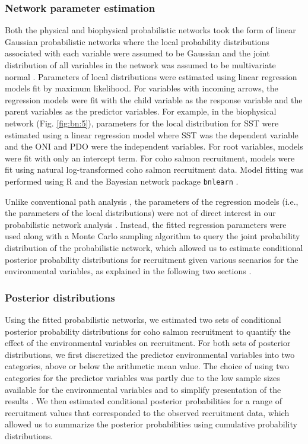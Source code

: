 \subsubsection{Network parameter estimation}

Both the physical and biophysical probabilistic networks took the form of linear
Gaussian probabilistic networks where the local probability distributions
associated with each variable were assumed to be Gaussian and the joint
distribution of all variables in the network was assumed to be multivariate
normal \citep{Shachter1989a, Koller2009a}. Parameters of local distributions
were estimated using linear regression models fit by maximum likelihood. For
variables with incoming arrows, the regression models were fit with the child
variable as the response variable and the parent variables as the predictor
variables. For example, in the biophysical network (Fig. \ref{fig:bn:5}),
parameters for the local distribution for SST were estimated using a linear
regression model where SST was the dependent variable and the ONI and PDO were
the independent variables. For root variables, models were fit with only an
intercept term. For coho salmon recruitment, models were fit using natural
log-transformed coho salmon recruitment data. Model fitting was performed using
R and the Bayesian network package \texttt{bnlearn} \citep{Scutari2010,
Rcore2013a}.

Unlike conventional path analysis \citep{Wright1934}, the parameters of the
regression models (i.e., the parameters of the local distributions) were not of
direct interest in our probabilistic network analysis \citep{Korb2004a,
Koller2009a}. Instead, the fitted regression parameters were used along with a
Monte Carlo sampling algorithm to query the joint probability distribution of
the probabilistic network, which allowed us to estimate conditional posterior
probability distributions for recruitment given various scenarios for the
environmental variables, as explained in the following two sections
\citep{Henrion1988a}.


\subsubsection{Posterior distributions}

Using the fitted probabilistic networks, we estimated two sets of conditional
posterior probability distributions for coho salmon recruitment to quantify the
effect of the environmental variables on recruitment. For both sets of posterior
distributions, we first discretized the predictor environmental variables into
two categories, above or below the arithmetic mean value. The choice of using
two categories for the predictor variables was partly due to the low sample
sizes available for the environmental variables and to simplify presentation of
the results \citep{Koller2009a}. We then estimated conditional posterior
probabilities for a range of recruitment values that corresponded to the
observed recruitment data, which allowed us to summarize the posterior
probabilities using cumulative probability distributions.


